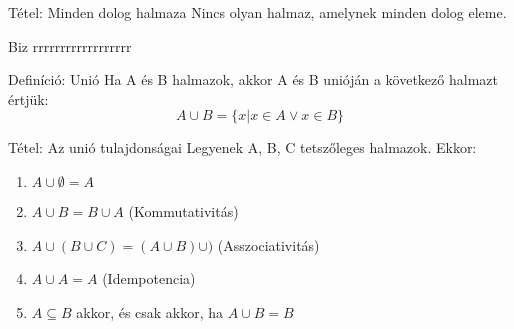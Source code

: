 \documentclass{beamer}
\begin{document}
\begin{frame}[plain]
\end{frame}

\begin{frame}[plain]
\end{frame}


\begin{frame}

\begin{block}{Tétel: Minden dolog halmaza}
Nincs olyan halmaz, amelynek minden dolog eleme.
\end{block}

\begin{block}{Biz}
rrrrrrrrrrrrrrrrrr
\end{block}

\end{frame}

\begin{frame}

\begin{block}{Definíció: Unió}
Ha A és B halmazok, akkor A és B unióján a következő halmazt értjük:\\
$$A \cup B = \{x | x \in A \vee x \in B\}$$
\end{block}

\begin{block}{Tétel: Az unió tulajdonságai}
Legyenek A, B, C tetszőleges halmazok. Ekkor:

\begin{enumerate}
\item $A \cup \emptyset = A$
\item $A \cup B = B \cup A$ (Kommutativitás)
\item $A \cup (B \cup C) = (A \cup B) \cup )$ (Asszociativitás)
\item $A \cup A = A$ (Idempotencia)
\item $A \subseteq B$ akkor, és csak akkor, ha $A \cup B = B$
\end{enumerate}

\end{block}

\end{frame}
\end{document}
